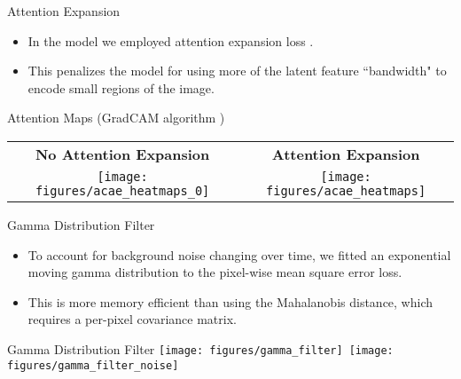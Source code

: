 \documentclass[10pt]{beamer}
\begin{document}
\begin{frame}{Attention Expansion}

\begin{itemize}
\item In the model we employed \alert{attention expansion loss} \cite{attention_anomalies}.

\item This penalizes the model for using more of the latent feature ``bandwidth" to encode small regions of the image.\\[0.5cm]
\end{itemize}

\begin{exampleblock}{Attention Maps (GradCAM algorithm \cite{grad_cam})}
~\\[2mm]
\begin{tabular}{c | c}
\textbf{No Attention Expansion} & \textbf{Attention Expansion}\\
\texttt{[image: figures/acae\_heatmaps\_0]} & \texttt{[image: figures/acae\_heatmaps]}
\end{tabular}
\end{exampleblock}
\end{frame}

\begin{frame}{Gamma Distribution Filter}

\begin{itemize}
\item To account for background noise changing over time, we fitted an \alert{exponential moving gamma distribution} to the pixel-wise mean square error loss.

\item This is more memory efficient than using the Mahalanobis distance, which requires a per-pixel covariance matrix.\\[0.5cm]
\end{itemize}
\pause
\begin{exampleblock}{Gamma Distribution Filter}
\texttt{[image: figures/gamma\_filter]}~\texttt{[image: figures/gamma\_filter\_noise]}
\end{exampleblock}
\end{frame}
\end{document}
